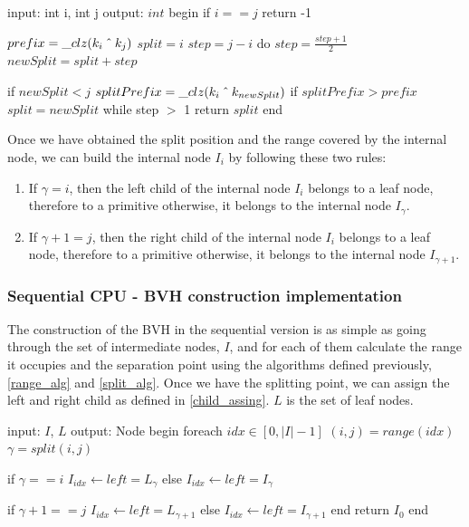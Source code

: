 \documentclass[titlepage,12pt]{report}
\begin{document}
\begin{algorithm}[caption={split}, label={split_alg}]
input: int i, int j
output: $int$
begin
  if $i == j$
    return -1

  $prefix = \_clz(k_i \XOR k_j)$  
  $split = i$
  $step = j - i$
  do
    $step = \frac{step + 1}{2}$
    $newSplit = split + step$
    
    if $newSplit < j$
      $splitPrefix = \_clz(k_i \XOR k_{newSplit})$
      if $splitPrefix > prefix$
        $split = newSplit$
  while step $>$ 1
  return $split$
end
\end{algorithm}

Once we have obtained the split position and the range covered by the internal node, we can build the internal node $I_i$ by following these two rules:

\begin{enumerate}\label{child_assing}

\item If $\gamma = i$, then the left child of the internal node $I_i$ belongs to a leaf node, therefore to a primitive otherwise, it belongs to the internal node $I_{\gamma}$.

\item If $\gamma + 1 = j$, then the right child of the internal node $I_i$ belongs to a leaf node, therefore to a primitive otherwise, it belongs to the internal node $I_{\gamma+1}$.

\end{enumerate}

\subsubsection{Sequential CPU - BVH construction implementation}

The construction of the BVH in the sequential version is as simple as going through the set of intermediate nodes, $I$, and for each of them calculate the range it occupies and the separation point using the algorithms defined previously, \ref{range_alg} and \ref{split_alg}. Once we have the splitting point, we can assign the left and right child as defined in \ref{child_assing}. $L$ is the set of leaf nodes.

\begin{algorithm}[caption={BVH construction CPU - sequential}, label={cpu_seq_bvh}]
input: $I$, $L$
output: Node
begin
  foreach $idx \in [0, |I|-1]$
    $(i,j) = range(idx)$
    $\gamma = split(i,j)$
    
    if $ \gamma == i $
      $I_{idx} \leftarrow left = L_{\gamma}$
    else 
      $I_{idx} \leftarrow left = I_{\gamma}$
    
    if $ \gamma+1 == j $
      $I_{idx} \leftarrow left = L_{\gamma+1}$
    else 
      $I_{idx} \leftarrow left = I_{\gamma+1}$
  end
  return $I_{0}$
end
\end{algorithm}
\end{document}
